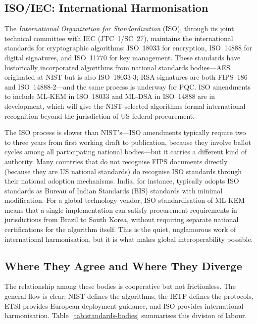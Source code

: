 \subsection{ISO/IEC: International Harmonisation}
\label{subsec:iso}

The \emph{International Organization for Standardization} (ISO), through its joint technical committee with IEC (JTC~1/SC~27), maintains the international standards for cryptographic algorithms: ISO~18033 for encryption, ISO~14888 for digital signatures, and ISO~11770 for key management. These standards have historically incorporated algorithms from national standards bodies---AES originated at NIST but is also ISO~18033-3; RSA signatures are both FIPS~186 and ISO~14888-2---and the same process is underway for PQC. ISO amendments to include ML-KEM in ISO~18033 and ML-DSA in ISO~14888 are in development, which will give the NIST-selected algorithms formal international recognition beyond the jurisdiction of US federal procurement.

The ISO process is slower than NIST's---ISO amendments typically require two to three years from first working draft to publication, because they involve ballot cycles among all participating national bodies---but it carries a different kind of authority. Many countries that do not recognise FIPS documents directly (because they are US national standards) do recognise ISO standards through their national adoption mechanisms. India, for instance, typically adopts ISO standards as Bureau of Indian Standards (BIS) standards with minimal modification. For a global technology vendor, ISO standardisation of ML-KEM means that a single implementation can satisfy procurement requirements in jurisdictions from Brazil to South Korea, without requiring separate national certifications for the algorithm itself. This is the quiet, unglamorous work of international harmonisation, but it is what makes global interoperability possible.

\subsection{Where They Agree and Where They Diverge}
\label{subsec:agree-diverge}

The relationship among these bodies is cooperative but not frictionless. The general flow is clear: NIST defines the algorithms, the IETF defines the protocols, ETSI provides European deployment guidance, and ISO provides international harmonisation. Table~\ref{tab:standards-bodies} summarises this division of labour.

